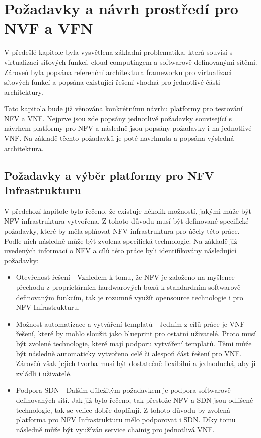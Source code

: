 \chapter{Požadavky a návrh prostředí pro NVF a VFN}

V předešlé kapitole byla vysvětlena základní problematika, která souvisí s virtualizací síťových funkcí, cloud computingem a softwarově definovanými sítěmi. Zároveň byla popsána referenční architektura frameworku pro virtualizaci síťových funkcí a popsána existující řešení vhodná pro jednotlivé části architektury.

Tato kapitola bude již věnována konkrétnímu návrhu platformy pro testování NFV a VNF. Nejprve jsou zde popsány jednotlivé požadavky související s návrhem platformy pro NFV a následně jsou popsány požadavky i na jednotlivé VNF. Na základě těchto požadavků je poté navrhnuta a popsána výsledná architektura.

\section{Požadavky a výběr platformy pro NFV Infrastrukturu}

V předchozí kapitole bylo řečeno, že existuje několik možností, jakými může být NFV infrastruktura vytvořena. Z tohoto důvodu musí být definované specifické požadavky, které by měla splňovat NFV infrastruktura pro účely této práce. Podle nich následně může být zvolena specifická technologie. Na základě již uvedených informací o NFV a cílů této práce byli identifikovány následující požadavky:

\begin{itemize}
\item Otevřenost řešení - Vzhledem k tomu, že NFV je založeno na myšlence přechodu z proprietárních hardwarových boxů k standardním softwarově definovaným funkcím, tak je rozumné využít opensource technologie i pro NFV Infrastrukturu. 
\item Možnost automatizace a vytváření templatů - Jedním z cílů práce je VNF řešení, které by mohlo sloužit jako blueprint pro ostatní uživatelé. Proto musí být zvolené technologie, které mají podporu vytváření templatů. Těmi může být následně automaticky vytvořeno celé či alespoň část řešení pro VNF. Zárověň však jejich tvorba musí být dostatečně flexibilní a jednoduchá, aby ji zvládli i uživatelé.
\item Podpora SDN - Dalším důležitým požadavkem je podpora softwarově definovaných sítí. Jak již bylo řečeno, tak přestože NFV a SDN jsou odlišené technologie, tak se velice dobře doplňují. Z tohoto důvodu by zvolená platforma pro NFV Infrastrukturu mělo podporovat i SDN. Díky tomu následně může být využíván service chainig pro jednotlivá VNF. 
\end{itemize}

